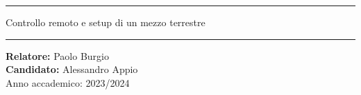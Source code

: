 \maketitle

\bigskip
\hrule
\bigskip

\begin{center}
  \noindent\huge{Controllo remoto e setup di un mezzo terrestre}
\end{center}

\bigskip
\hrule
\bigskip

\vfill
\begin{center}
  \large{\textbf{Relatore:} Paolo Burgio}\\
  \large{\textbf{Candidato:} Alessandro Appio}\\
  \bigskip
  \large{Anno accademico: 2023/2024}
\end{center}
